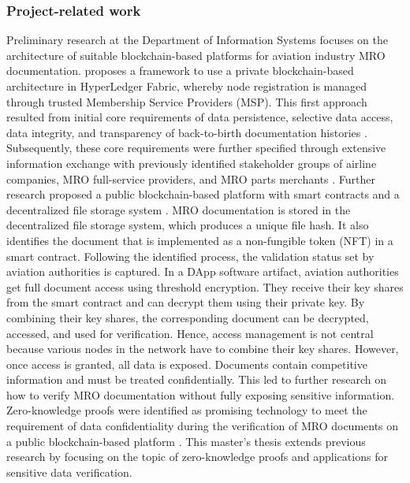 \subsubsection{Project-related work}
Preliminary research at the Department of Information Systems focuses on the architecture of suitable blockchain-based platforms for aviation industry MRO documentation. \citet{WickboldtMeiseKliewer} proposes a framework to use a private blockchain-based architecture in HyperLedger Fabric, whereby node registration is managed through trusted Membership Service Providers (MSP). This first approach resulted from initial core requirements of data persistence, selective data access, data integrity, and transparency of back-to-birth documentation histories \citep{WickboldtClemens2018BzdD}. Subsequently, these core requirements were further specified through extensive information exchange with previously identified stakeholder groups of airline companies, MRO full-service providers, and MRO parts merchants \citep{ZedelJ}. Further research proposed a public blockchain-based platform with smart contracts and a decentralized file storage system \citep{ZedelJ}. MRO documentation is stored in the decentralized file storage system, which produces a unique file hash. It also identifies the document that is implemented as a non-fungible token (NFT) in a smart contract. Following the identified process, the validation status set by aviation authorities is captured. In a DApp software artifact, aviation authorities get full document access using threshold encryption. They receive their key shares from the smart contract and can decrypt them using their private key. By combining their key shares, the corresponding document can be decrypted, accessed, and used for verification. Hence, access management is not central because various nodes in the network have to combine their key shares. However, once access is granted, all data is exposed. Documents contain competitive information and must be treated confidentially. This led to further research on how to verify MRO documentation without fully exposing sensitive information. Zero-knowledge proofs were identified as promising technology to meet the requirement of data confidentiality during the verification of MRO documents on a public blockchain-based platform \citep{ZedelJ}. This master's thesis extends previous research by focusing on the topic of zero-knowledge proofs and applications for sensitive data verification.

